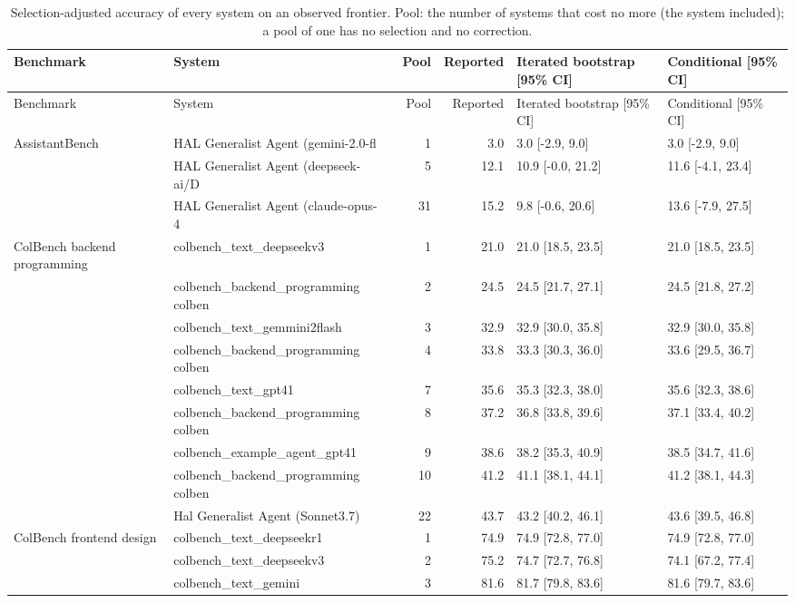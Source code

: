 \begin{longtable}{llrrll}
\caption{Selection-adjusted accuracy of every system on an observed frontier. Pool: the number of systems that cost no more (the system included); a pool of one has no selection and no correction.}\label{tab:supp-curse}\\
\toprule
Benchmark & System & Pool & Reported & Iterated bootstrap [95\% CI] & Conditional [95\% CI] \\
\midrule
\endfirsthead
\toprule
Benchmark & System & Pool & Reported & Iterated bootstrap [95\% CI] & Conditional [95\% CI] \\
\midrule
\endhead
\bottomrule
\endfoot
AssistantBench & HAL Generalist Agent (gemini-2.0-fl~ & 1 & 3.0 & 3.0 [-2.9, 9.0] & 3.0 [-2.9, 9.0] \\
 & HAL Generalist Agent (deepseek-ai/D~ & 5 & 12.1 & 10.9 [-0.0, 21.2] & 11.6 [-4.1, 23.4] \\
 & HAL Generalist Agent (claude-opus-4~ & 31 & 15.2 & 9.8 [-0.6, 20.6] & 13.6 [-7.9, 27.5] \\
ColBench backend programming & colbench\_text\_deepseekv3 & 1 & 21.0 & 21.0 [18.5, 23.5] & 21.0 [18.5, 23.5] \\
 & colbench\_backend\_programming colben~ & 2 & 24.5 & 24.5 [21.7, 27.1] & 24.5 [21.8, 27.2] \\
 & colbench\_text\_gemmini2flash & 3 & 32.9 & 32.9 [30.0, 35.8] & 32.9 [30.0, 35.8] \\
 & colbench\_backend\_programming colben~ & 4 & 33.8 & 33.3 [30.3, 36.0] & 33.6 [29.5, 36.7] \\
 & colbench\_text\_gpt41 & 7 & 35.6 & 35.3 [32.3, 38.0] & 35.6 [32.3, 38.6] \\
 & colbench\_backend\_programming colben~ & 8 & 37.2 & 36.8 [33.8, 39.6] & 37.1 [33.4, 40.2] \\
 & colbench\_example\_agent\_gpt41 & 9 & 38.6 & 38.2 [35.3, 40.9] & 38.5 [34.7, 41.6] \\
 & colbench\_backend\_programming colben~ & 10 & 41.2 & 41.1 [38.1, 44.1] & 41.2 [38.1, 44.3] \\
 & Hal Generalist Agent (Sonnet3.7) & 22 & 43.7 & 43.2 [40.2, 46.1] & 43.6 [39.5, 46.8] \\
ColBench frontend design & colbench\_text\_deepseekr1 & 1 & 74.9 & 74.9 [72.8, 77.0] & 74.9 [72.8, 77.0] \\
 & colbench\_text\_deepseekv3 & 2 & 75.2 & 74.7 [72.7, 76.8] & 74.1 [67.2, 77.4] \\
 & colbench\_text\_gemini & 3 & 81.6 & 81.7 [79.8, 83.6] & 81.6 [79.7, 83.6] \\

\end{longtable}
